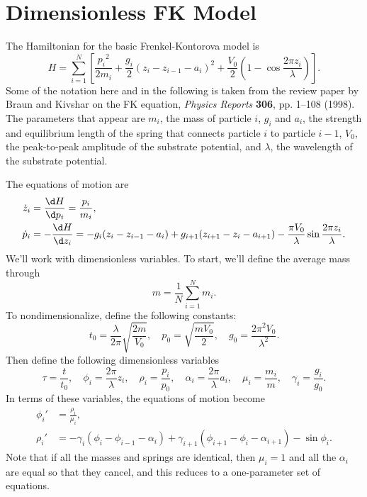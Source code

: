 \documentclass[11pt]{article}
\begin{document}
\section{Dimensionless FK Model}

The Hamiltonian for the basic Frenkel-Kontorova model is
\begin{equation}
H=\sum_{i=1}^N\left[\frac{{p_i}^2}{2m_i}
	+\frac{g_i}{2}\left(z_i-z_{i-1}-a_i\right)^2
	+\frac{V_0}{2}\left(1-\cos\frac{2\pi z_i}{\lambda}\right)\right].
\end{equation}
Some of the notation here and in the following is taken from the review paper by Braun and Kivshar on the FK equation, \textit{Physics Reports} \textbf{306}, pp. 1--108 (1998). The parameters that appear are $m_i$, the mass of particle $i$, $g_i$ and $a_i$, the strength and equilibrium length of the spring that connects particle $i$ to particle $i-1$, $V_0$, the peak-to-peak amplitude of the substrate potential, and $\lambda$, the wavelength of the substrate potential.

The equations of motion are
\begin{align}
\dot{z}_i&=\frac{\d H}{\d p_i}=\frac{p_i}{m_i},\\
\dot{p}_i&=-\frac{\d H}{\d z_i}=-g_i(z_i-z_{i-1}-a_i)
	+g_{i+1}(z_{i+1}-z_i-a_{i+1})
	-\frac{\pi V_0}{\lambda}\sin\frac{2\pi z_i}{\lambda}.
\end{align}
We'll work with dimensionless variables. To start, we'll define the average mass through
\begin{equation}
m=\frac{1}{N}\sum_{i=1}^N m_i.
\end{equation}
To nondimensionalize, define the following constants:
\begin{equation}
t_0 = \frac{\lambda}{2\pi}\sqrt{\frac{2m}{V_0}},\quad
p_0 = \sqrt{\frac{mV_0}{2}},\quad
g_0 = \frac{2\pi^2V_0}{\lambda^2}.
\end{equation}
Then define the following dimensionless variables
\begin{equation}
\tau=\frac{t}{t_0},\quad
\phi_i=\frac{2\pi}{\lambda} z_i,\quad
\rho_i=\frac{p_i}{p_0},\quad
\alpha_i=\frac{2\pi}{\lambda} a_i,\quad
\mu_i=\frac{m_i}{m},\quad
\gamma_i=\frac{g_i}{g_0}.
\end{equation}
In terms of these variables, the equations of motion become
\begin{align}
\phi_i'&=\frac{\rho_i}{\mu_i},\\
\rho_i'&=-\gamma_i(\phi_i-\phi_{i-1}-\alpha_i)
	+\gamma_{i+1}(\phi_{i+1}-\phi_i-\alpha_{i+1})
	-\sin\phi_i.
\end{align}
Note that if all the masses and springs are identical, then $\mu_i=1$ and all the $\alpha_i$ are equal so that they cancel, and this reduces to a one-parameter set of equations.
\end{document}
